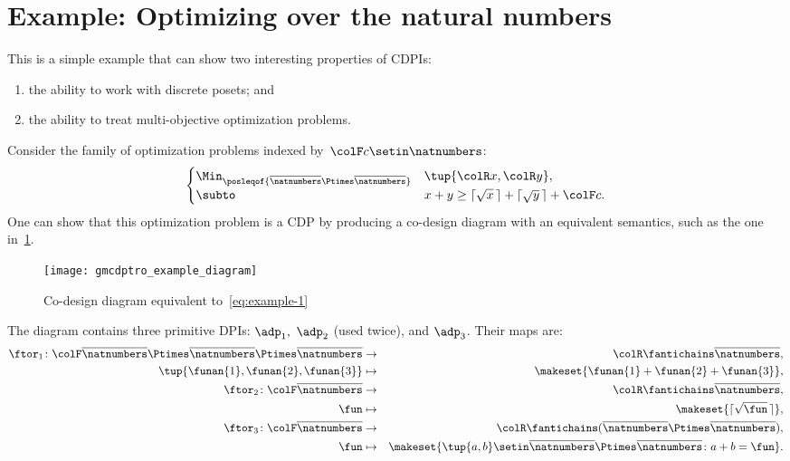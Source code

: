 \section{Example: Optimizing over the natural numbers}

This is a simple example that can show two interesting properties of CDPIs:
\begin{enumerate}
    \item the ability to work with discrete posets; and
    \item the ability to treat multi-objective optimization problems.
\end{enumerate}
Consider the family of optimization problems indexed by~${\colF c}\setin\natnumbers$:
%
\begin{equation}
    \begin{cases}
        \Min_{\posleqof{\overline{\natnumbers}\Ptimes\overline{\natnumbers}}} & \tup{{\colR x},{\colR y}},                                      \\
        \subto                                                                & x+y\geq\lceil\sqrt{x}\,\rceil+\lceil\sqrt{y}\,\rceil+{\colF c}.
    \end{cases}\label{eq:example-1}
\end{equation}
%
One can show that this optimization problem is a CDP by producing a co-design diagram with an equivalent semantics, such as the one in~\cref{fig:toydiagram}.

\begin{figure}[h]
    \centering
    \texttt{[image: gmcdptro\_example\_diagram]}
    \caption{Co-design diagram equivalent to~\cref{eq:example-1}}
    \label{fig:toydiagram}
\end{figure}

The diagram contains three primitive DPIs: $\adp_{1},$ $\adp_{2}$ (used twice), and $\adp_{3}$.
Their \ftor maps are:
\begin{eqnarray*}
    \ftor_{1}\colon {\colF\overline{\natnumbers}\Ptimes\overline{\natnumbers}\Ptimes\overline{\natnumbers}} & \to & {\colR\fantichains\overline{\natnumbers}},\\
    \tup{\funan{1},\funan{2},\funan{3}}  & \mapsto & \makeset{\funan{1}+\funan{2}+\funan{3}},\\
    \ftor_{2}\colon {\colF\overline{\natnumbers}} & \rightarrow & {\colR\fantichains\overline{\natnumbers}},\\
    \fun& \mapsto & \makeset{\lceil\sqrt{\fun}\,\rceil},\\
    \ftor_{3}\colon{\colF\overline{\natnumbers}} & \rightarrow & {\colR\fantichains(\overline{\natnumbers}\Ptimes\overline{\natnumbers})},\\
    \fun& \mapsto & \makeset{\tup{a,b} \setin\overline{\natnumbers}\Ptimes\overline{\natnumbers}\colon a+b=\fun}.
\end{eqnarray*}

